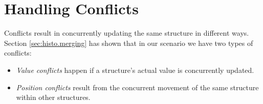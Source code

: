 
\section{Handling Conflicts}

Conflicts result in concurrently updating the same structure in different ways.
Section \ref{sec:histo.merging} has shown that in our scenario we have two types of conflicts:

\begin{itemize}
\item \emph{Value conflicts} happen if a structure's actual value is concurrently updated.
\item \emph{Position conflicts} result from the concurrent movement of the same structure within other structures.
\end{itemize}

